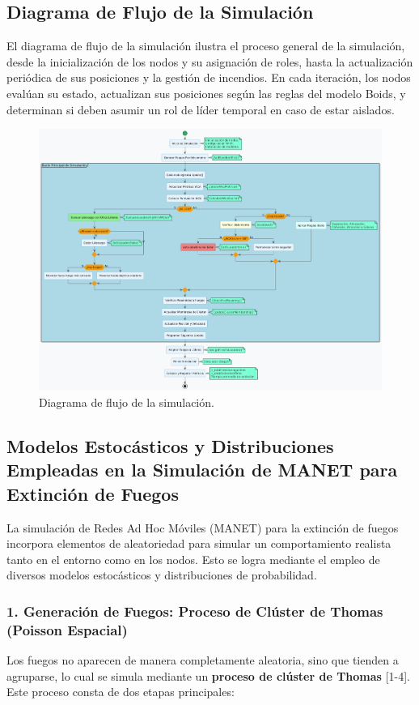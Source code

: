 \documentclass{article}
\begin{document}
\subsection{Diagrama de Flujo de la Simulación}
El diagrama de flujo de la simulación ilustra el proceso general de la simulación, desde la inicialización de los nodos y su asignación de roles, hasta la actualización periódica de sus posiciones y la gestión de incendios. En cada iteración, los nodos evalúan su estado, actualizan sus posiciones según las reglas del modelo Boids, y determinan si deben asumir un rol de líder temporal en caso de estar aislados.
\begin{figure}[H]
    \centering
    \includegraphics[width=1\textwidth]{flow_simulation_diagram.png}
    \caption{Diagrama de flujo de la simulación.}
    \label{fig:uml-flow}
\end{figure}

\subsection{Modelos Estocásticos y Distribuciones Empleadas en la Simulación de MANET para Extinción de Fuegos}

La simulación de Redes Ad Hoc Móviles (MANET) para la extinción de fuegos incorpora elementos de aleatoriedad para simular un comportamiento realista tanto en el entorno como en los nodos. Esto se logra mediante el empleo de diversos modelos estocásticos y distribuciones de probabilidad.

\subsubsection*{1. Generación de Fuegos: Proceso de Clúster de Thomas (Poisson Espacial)}
Los fuegos no aparecen de manera completamente aleatoria, sino que tienden a agruparse, lo cual se simula mediante un \textbf{proceso de clúster de Thomas} [1-4]. Este proceso consta de dos etapas principales:
\end{document}
